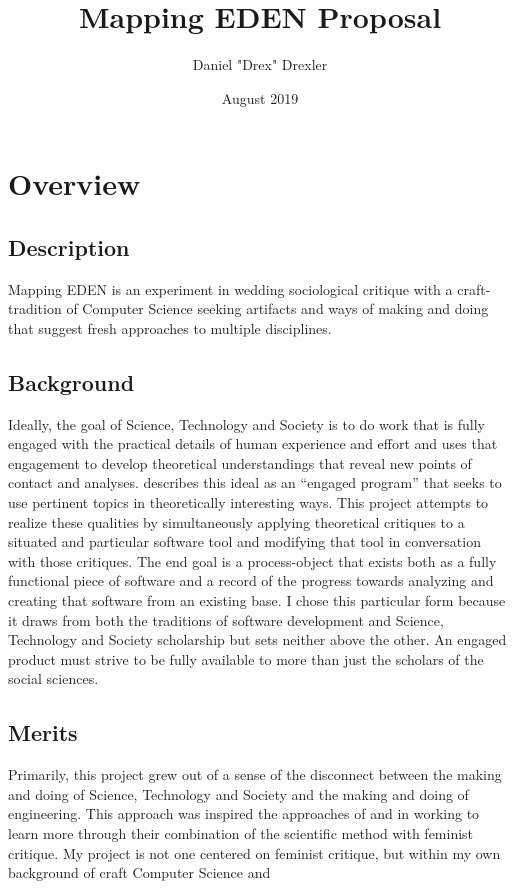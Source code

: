 \documentclass[a4paper,man,natbib]{apa6}
\title{Mapping EDEN Proposal}
\author{Daniel "Drex" Drexler}
\affiliation{Center for Science, Technology and Society at Drexel University}
\date{August 2019}
\begin{document}
   \maketitle
   \clearpage
   \section*{Overview}
   \subsection*{Description}
   Mapping EDEN is an experiment in wedding sociological critique with a craft-tradition of Computer Science seeking artifacts and ways of making and doing that suggest fresh approaches to multiple disciplines.
   \subsection*{Background}
   Ideally, the goal of Science, Technology and Society is to do work that is fully engaged with the practical details of human experience and effort and uses that engagement to develop theoretical understandings that reveal new points of contact and analyses. \citet{Sismondo2008-xz} describes this ideal as an “engaged program” that seeks to use pertinent topics in theoretically interesting ways. This project attempts to realize these qualities by simultaneously applying theoretical critiques to a situated and particular software tool and modifying that tool in conversation with those critiques. The end goal is a process-object that exists both as a fully functional piece of software and a record of the progress towards analyzing and creating that software from an existing base. I chose this particular form because it draws from both the traditions of software development and Science, Technology and Society scholarship but sets neither above the other. An engaged product must strive to be fully available to more than just the scholars of the social sciences.
   \subsection*{Merits}
   Primarily, this project grew out of a sense of the disconnect between the making and doing of Science, Technology and Society and the making and doing of engineering. This approach was inspired the approaches of \citet{Roy2018-ma} and \citet{Subramaniam2014-wg} in working to learn more through their combination of the scientific method with feminist critique. My project is not one centered on feminist critique, but within my own background of craft Computer Science \citep[see]{Ensmenger2012-kz} and 
\end{document}
